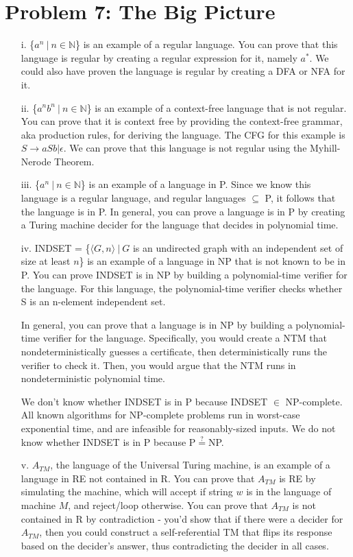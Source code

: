 \documentclass[10pt,letter]{article}
\begin{document}
\section*{Problem 7: The Big Picture}
\begin{enumerate}
\item[i.] \{$a^n\ |\ n \in \mathbb{N}$\} is an example of a regular language. You can prove that this language is regular by creating a regular expression for it, namely $a^*$. We could also have proven the language is regular by creating a DFA or NFA for it.
\item[ii.] \{$a^nb^n\ |\ n \in \mathbb{N}$\} is an example of a context-free language that is not regular. You can prove that it is context free by providing the context-free grammar, aka production rules, for deriving the language. The CFG for this example is $S \rightarrow aSb | \epsilon$. We can prove that this language is not regular using the Myhill-Nerode Theorem.
\item[iii.]  \{$a^n\ |\ n \in \mathbb{N}$\} is an example of a language in P. Since we know this language is a regular language, and regular languages $\subseteq$ P, it follows that the language is in P. In general, you can prove a language is in P by creating a Turing machine decider for the language that decides in polynomial time.

\item[iv.] INDSET = \{$\langle G, n \rangle\ |\ G$ is an undirected graph with an independent set of size at least $n$\} is an example of a language in NP that is not known to be in P. You can prove INDSET is in NP by building a polynomial-time verifier for the language. For this language, the polynomial-time verifier checks whether S is an n-element independent set.

In general, you can prove that a language is in NP by building a polynomial-time verifier for the language. Specifically, you would create a NTM that nondeterministically guesses a certificate, then deterministically runs the verifier to check it. Then, you would argue that the NTM runs in nondeterministic polynomial time. 

We don't know whether INDSET is in P because INDSET $\in$ NP-complete. All known algorithms for NP-complete problems run in worst-case exponential time, and are infeasible for reasonably-sized inputs. We do not know whether INDSET is in P because P$\stackrel{?}{=}$NP.

\item[v.] $A_{TM}$, the language of the Universal Turing machine, is an example of a language in RE not contained in R. You can prove that $A_{TM}$ is RE by simulating the machine, which will accept if string $w$ is in the language of machine $M$, and reject/loop otherwise. You can prove that $A_{TM}$ is not contained in R by contradiction - you'd show that if there were a decider for $A_{TM}$, then you could construct a self-referential TM that flips its response based on the decider's answer, thus contradicting the decider in all cases.


\end{enumerate}
\end{document}
